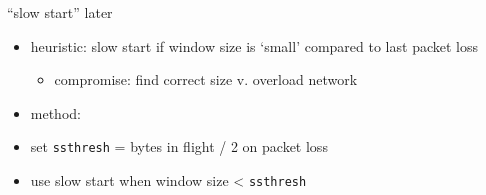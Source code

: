 
\begin{frame}{``slow start'' later}
    \begin{itemize}
    \item heuristic: slow start if window size is `small' compared to last packet loss
        \begin{itemize}
        \item compromise: find correct size v. overload network
        \end{itemize}
    \vspace{.5cm}
    \item method:
    \item set \texttt{ssthresh} = bytes in flight / 2 on packet loss
    \item use slow start when window size < \texttt{ssthresh}
    \end{itemize}
\end{frame}
